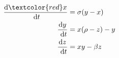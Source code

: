\documentclass[preview]{standalone}
\begin{document}
\begin{center}
\[
            \begin{aligned}
            \frac{\mathrm{d} \textcolor{red}x}{\mathrm{~d} t} & =\sigma(y-x) \\
            \frac{\mathrm{d} y}{\mathrm{~d} t} & = x(\rho-z)-y \\
            \frac{\mathrm{d} z}{\mathrm{~d} t} & = x y-\beta z
            \end{aligned}
            \]
\end{center}
\end{document}
